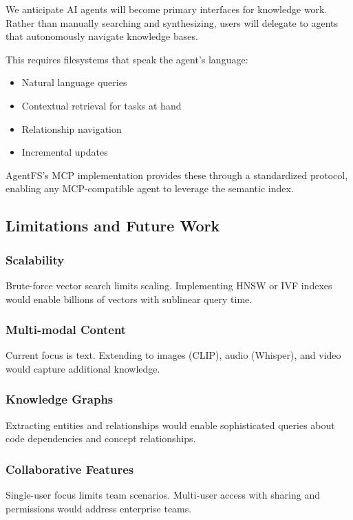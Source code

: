 \documentclass[conference]{IEEEtran}
\begin{document}
We anticipate AI agents will become primary interfaces for knowledge work. Rather than manually searching and synthesizing, users will delegate to agents that autonomously navigate knowledge bases.

This requires filesystems that speak the agent's language:

\begin{itemize}
    \item Natural language queries
    \item Contextual retrieval for tasks at hand
    \item Relationship navigation
    \item Incremental updates
\end{itemize}

AgentFS's MCP implementation provides these through a standardized protocol, enabling any MCP-compatible agent to leverage the semantic index.

\subsection{Limitations and Future Work}

\subsubsection{Scalability}
Brute-force vector search limits scaling. Implementing HNSW or IVF indexes would enable billions of vectors with sublinear query time.

\subsubsection{Multi-modal Content}
Current focus is text. Extending to images (CLIP), audio (Whisper), and video would capture additional knowledge.

\subsubsection{Knowledge Graphs}
Extracting entities and relationships would enable sophisticated queries about code dependencies and concept relationships.

\subsubsection{Collaborative Features}
Single-user focus limits team scenarios. Multi-user access with sharing and permissions would address enterprise teams.
\end{document}
